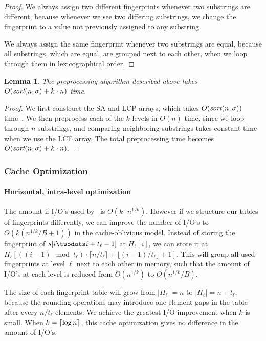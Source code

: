 \documentclass[a4]{article}
\newtheorem{lemma}{Lemma}
\begin{document}
\begin{proof}
We always assign two different fingerprints whenever two substrings are different, because whenever we see two differing substrings, we change the fingerprint to a value not previously assigned to any substring.

We always assign the same fingerprint whenever two substrings are equal, because all substrings, which are equal, are grouped next to each other, when we loop through them in lexicographical order.
\end{proof}

\begin{lemma}
The preprocessing algorithm described above takes $O(\textit{sort}(n,\sigma) + k\cdot n)$ time.
\end{lemma}

\begin{proof}
We first construct the SA and LCP arrays, which takes $O(\textit{sort}(n,\sigma))$ time~\cite{sort-complexity}. We then preprocess each of the $k$ levels in $O(n)$ time, since we loop through $n$ substrings, and comparing neighboring substrings takes constant time when we use the LCE array. The total preprocessing time becomes $O(\textit{sort}(n,\sigma) + k\cdot n)$.
\end{proof}

\ifreport

\subsubsection{Cache Optimization\label{sec:fingerprint-cache}}

\paragraph{Horizontal, intra-level optimization}

The amount if I/O's used by \fprintk\ is $O(k\cdot n^{1/k})$. However if we structure our tables of fingerprints differently, we can improve the number of I/O's to $O(k(n^{1/k}/B+1))$ in the cache-oblivious model. Instead of storing the fingerprint of $s[i\twodots i+t_\ell-1]$ at $H_\ell[i]$, we can store it at $H_\ell[((i-1)\mod t_\ell)\cdot\lceil n/t_\ell\rceil+\lfloor (i-1)/t_\ell\rfloor+1]$. This will group all used fingerprints at level $\ell$ next to each other in memory, such that the amount of I/O's at each level is reduced from $O(n^{1/k})$ to $O(n^{1/k}/B)$.

The size of each fingerprint table will grow from $|H_\ell| = n$ to $|H_\ell| = n+t_\ell$, because the rounding operations may introduce one-element gaps in the table after every $n/t_\ell$ elements. We achieve the greatest I/O improvement when $k$ is small. When $k=\lceil\log n\rceil$, this cache optimization gives no difference in the amount of I/O's.
\end{document}
